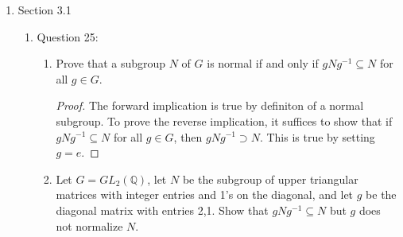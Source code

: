 \documentclass{article}
\begin{document}
\begin{enumerate}
  \item Section 3.1
    \begin{enumerate}
      \item Question 25:
        \begin{enumerate}
          \item Prove that a subgroup $N$ of $G$ is normal if and only if
            $gNg^{-1}\subseteq N$ for all $g\in G$.
            \begin{proof}
              The forward implication is true by definiton of a normal
              subgroup. To prove the reverse implication, it suffices to
              show that if $gNg^{-1}\subseteq N$ for all $g\in G$, then
              $gNg^{-1}\supset N$. This is true by setting $g=e$.
            \end{proof}

          \item Let $G=GL_2(\mathbb{Q})$, let $N$ be the subgroup of upper
            triangular matrices with integer entries and 1's on the
            diagonal, and let $g$ be the diagonal matrix with entries 2,1.
            Show that $gNg^{-1}\subseteq N$ but $g$ does not normalize $N$.


\end{enumerate}
\end{enumerate}
\end{enumerate}
\end{document}
